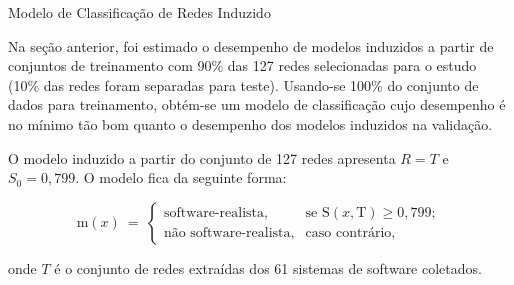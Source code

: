 \begin{section}{Modelo de Classificação de Redes Induzido} \label{cap:clas4}
	
	Na seção anterior, foi estimado o desempenho de modelos induzidos a partir de conjuntos de treinamento com 90\% das 127 redes selecionadas para o estudo (10\% das redes foram separadas para teste). Usando-se 100\% do conjunto de dados para treinamento, obtém-se um modelo de classificação cujo desempenho é no mínimo tão bom quanto o desempenho dos modelos induzidos na validação.
	
	O modelo induzido a partir do conjunto de 127 redes apresenta $R = T$ e $S_0 = 0,799$. O modelo fica da seguinte forma:
	
	$$
	\mathrm{m}(x) ~=~
	\left\{
	\begin{array}{cl}
	\mbox{software-realista,} & \mbox{se } \mathrm{S}(x, \mbox{T}) \ge 0,799; \\
	\mbox{não software-realista,} & \mbox{caso contrário,}
	\end{array}
	\right.
	$$

	onde $T$ é o conjunto de redes extraídas dos 61 sistemas de software coletados.
		
	
	
\end{section}

